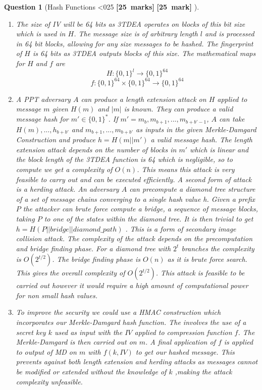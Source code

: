 \documentclass[a4paper]{article}
\theoremstyle{que}
\newtheorem{question}{Question}
\newcommand{\fixoffset}{\mbox{}\vspace*{-\bigskipamount}\vspace*{-\medskipamount}}
\newcommand\points[1]{%
\ifnum1<0#1\relax%
    {\bf \small [#1~marks]}%
  \else%
    {\bf \small [#1~mark]}%
  \fi%
}%
\begin{document}
\begin{question}[Hash Functions \points{25}]
  \fixoffset
  \begin{enumerate}[label=(\alph*)]
    \item The size of IV will be 64 bits as 3TDEA operates on blocks of this bit size which is used in \(H \). The message size is of arbitrary length \(l \) and is processed in 64 bit blocks, allowing for any size messages to be hashed. The fingerprint of \(H \) is 64 bits as 3TDEA outputs blocks of this size.
    The mathematical maps for \(H \) and \(f \) are
    \[ H : \{0,1\}^l \rightarrow \{0,1\}^{64}\]
    \[ f : \{0,1\}^{64}  \times \{0,1\}^{64}\rightarrow \{0,1\}^{64}\]
    
    \item A PPT adversary \(A\) can produce a length extension attack on \(H\) applied to message \(m\) given \(H(m)\) and \(|m|\) is known. They can produce a valid message hash for \(m' \in \{0,1\}^*\). If \(m' = m_b,m_{b+1},...,m_{b+b'-1}\), \(A\) can take \(H(m),...,h_{b+b'}\) and \(m_{b+1},...,m_{b+b'}\) as inputs in the given  Merkle-Damgard Construction and produce \(h=H(m||m')\) a valid message hash. The length extension attack depends on the number of blocks in \(m'\) which is linear and the block length of the 3TDEA function is 64 which is negligible, so to compute we get a complexity of \(O(n)\). This means this attack is very feasible to carry out and can be executed efficiently.
    A second form of attack is a herding attack. An adversary \(A\) can precompute a diamond tree structure of a set of message chains converging to a single hash value h. Given a prefix \(P\) the attacker can brute force compute a bridge, a sequence of message blocks, taking \(P\) to one of the states within the diamond tree. It is then trivial to get \(h=H(P||bridge||diamond\_path)\) \cite{kelsey2006herding}. This is a form of secondary image collision attack. The complexity of the attack depends on the precomputation and bridge finding phase. For a diamond tree with \(2^t\) branches the complexity is \(O(2^{t/2})\). The bridge finding phase is \(O(n)\) as it is brute force search. This gives the overall complexity of \(O(2^{t/2})\). This attack is feasible to be carried out however it would require a high amount of computational power for non small hash values.
    
    \item To improve the security we could use a HMAC construction which incorporates our Merkle-Damgard hash function. The involves the use of a secret key \(k\) used as input with the \(IV\) applied to compression function \(f\). The Merkle-Damgard is then carried out on \(m\). A final application of \(f\) is applied to output of MD on \(m\) with \(f(k,IV)\) to get our hashed message. This prevents against both length extension and herding attacks as messages cannot be modified or extended without the knowledge of \(k\) ,making the attack complexity unfeasible.
    

\end{enumerate}
\end{question}
\end{document}
